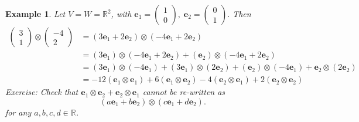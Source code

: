 \documentclass[11pt]{article}
\newtheorem{example}[theorem]{Example}
\begin{document}
\begin{example} 
Let \(V = W = {\mathbb{R}}^2\), with
\({\mathbf{e}}_1 = \left( \begin{array}{l} 1 \\  0 \end{array}\right) ,\;{\mathbf{e}}_2 = \left( \begin{array}{l} 0 \\  1 \end{array}\right) .
\)
Then
\begin{align*}
\left( \begin{array}{l} 3 \\  1 \end{array}\right)  \otimes  \left( \begin{matrix}  - 4 \\  2 \end{matrix}\right)  &= \left( {3{\mathbf{e}}_1 + 2{\mathbf{e}}_2}\right)  \otimes  \left( {-4{\mathbf{e}}_1 + 2{\mathbf{e}}_2}\right)
\\
&= \left( {3{\mathbf{e}}_1}\right)  \otimes  \left( {-4{\mathbf{e}}_1 + 2{\mathbf{e}}_2}\right)  + \left( {\mathbf{e}}_2\right)  \otimes  \left( {-4{\mathbf{e}}_1 + 2{\mathbf{e}}_2}\right)
\\
&= \left( {3{\mathbf{e}}_1}\right)  \otimes  \left( {-4{\mathbf{e}}_1}\right)  + \left( {3{\mathbf{e}}_1}\right)  \otimes  \left( {2{\mathbf{e}}_2}\right)  + \left( {\mathbf{e}}_2\right)  \otimes  \left( {-4{\mathbf{e}}_1}\right)  + {\mathbf{e}}_2 \otimes  \left( {2{\mathbf{e}}_2}\right)
\\
&=  - {12}\left( {{\mathbf{e}}_1 \otimes  {\mathbf{e}}_1}\right)  + 6\left( {{\mathbf{e}}_1 \otimes  {\mathbf{e}}_2}\right)  - 4\left( {{\mathbf{e}}_2 \otimes  {\mathbf{e}}_1}\right)  + 2\left( {{\mathbf{e}}_2 \otimes  {\mathbf{e}}_2}\right)
\end{align*}
Exercise: Check that \({\mathbf{e}}_1 \otimes  {\mathbf{e}}_2 + {\mathbf{e}}_2 \otimes  {\mathbf{e}}_1\) cannot be re-written as
\[
\left( {a{\mathbf{e}}_1 + b{\mathbf{e}}_2}\right)  \otimes  \left( {c{\mathbf{e}}_1 + d{\mathbf{e}}_2}\right).
\]
for any $a,b,c,d \in  \mathbb{R}$.
\end{example}
\end{document}
